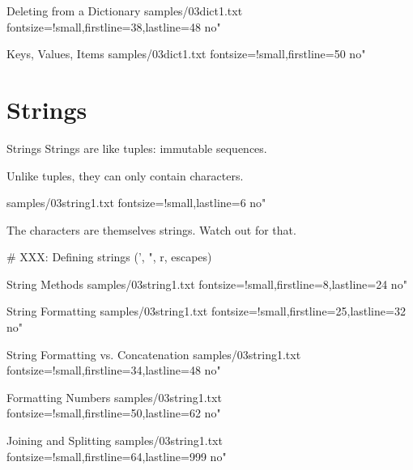 \documentclass{pyslides}
\begin{document}
\begin{frame}[fragile]{Deleting from a Dictionary}
 samples/03dict1.txt fontsize=!small,firstline=38,lastline=48 no"
\end{frame}

\begin{frame}[fragile]{Keys, Values, Items}
 samples/03dict1.txt fontsize=!small,firstline=50 no"
\end{frame}


\section{Strings}

\begin{frame}[fragile]{Strings}
Strings are like tuples: immutable sequences.

Unlike tuples, they can only contain characters.

 samples/03string1.txt fontsize=!small,lastline=6 no"

\bigskip

The characters are themselves strings. Watch out for that.
\end{frame}

# XXX: Defining strings (', ", r, escapes)

\begin{frame}[fragile]{String Methods}
 samples/03string1.txt fontsize=!small,firstline=8,lastline=24 no"
\end{frame}

\begin{frame}[fragile]{String Formatting}
 samples/03string1.txt fontsize=!small,firstline=25,lastline=32 no"
\end{frame}

\begin{frame}[fragile]{String Formatting vs. Concatenation}
 samples/03string1.txt fontsize=!small,firstline=34,lastline=48 no"
\end{frame}

\begin{frame}[fragile]{Formatting Numbers}
 samples/03string1.txt fontsize=!small,firstline=50,lastline=62 no"
\end{frame}

\begin{frame}[fragile]{Joining and Splitting}
 samples/03string1.txt fontsize=!small,firstline=64,lastline=999 no"
\end{frame}
\end{document}
